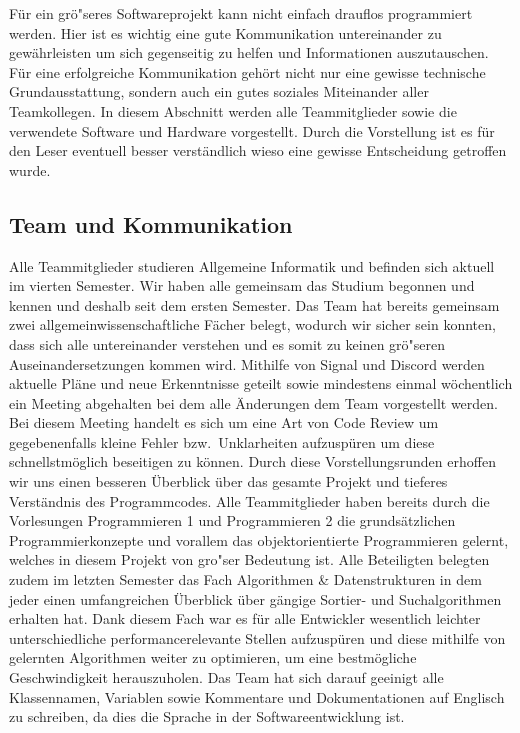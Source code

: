 F\"ur ein gr\"o"seres Softwareprojekt kann nicht einfach drauflos programmiert werden.
Hier ist es wichtig eine gute Kommunikation untereinander zu gew\"ahrleisten um sich gegenseitig zu helfen und Informationen auszutauschen.
F\"ur eine erfolgreiche Kommunikation geh\"ort nicht nur eine gewisse technische Grundausstattung, sondern auch ein gutes soziales Miteinander aller Teamkollegen.
In diesem Abschnitt werden alle Teammitglieder sowie die verwendete Software und Hardware vorgestellt.
Durch die Vorstellung ist es f\"ur den Leser eventuell besser verst\"andlich wieso eine gewisse Entscheidung getroffen wurde.

\subsection{Team und Kommunikation}\label{subsec:team-und-kommunikation}
Alle Teammitglieder studieren Allgemeine Informatik und befinden sich aktuell im vierten Semester.
Wir haben alle gemeinsam das Studium begonnen und kennen und deshalb seit dem ersten Semester.
Das Team hat bereits gemeinsam zwei allgemeinwissenschaftliche F\"acher belegt, wodurch wir sicher sein konnten, dass sich alle untereinander verstehen und es somit zu keinen gr\"o"seren Auseinandersetzungen kommen wird.
Mithilfe von Signal und Discord werden aktuelle Pl\"ane und neue Erkenntnisse geteilt sowie mindestens einmal w\"ochentlich ein Meeting abgehalten bei dem alle \"Anderungen dem Team vorgestellt werden.
Bei diesem Meeting handelt es sich um eine Art von Code Review um gegebenenfalls kleine Fehler bzw.\ Unklarheiten aufzusp\"uren um diese schnellstm\"oglich beseitigen zu k\"onnen.
Durch diese Vorstellungsrunden erhoffen wir uns einen besseren \"Uberblick \"uber das gesamte Projekt und tieferes Verst\"andnis des Programmcodes.
Alle Teammitglieder haben bereits durch die Vorlesungen Programmieren 1 und Programmieren 2 die grunds\"atzlichen Programmierkonzepte und vorallem das objektorientierte Programmieren gelernt, welches in diesem Projekt von gro"ser Bedeutung ist.
Alle Beteiligten belegten zudem im letzten Semester das Fach Algorithmen \& Datenstrukturen in dem jeder einen umfangreichen \"Uberblick \"uber g\"angige Sortier- und Suchalgorithmen erhalten hat.
Dank diesem Fach war es f\"ur alle Entwickler wesentlich leichter unterschiedliche performancerelevante Stellen aufzusp\"uren und diese mithilfe von gelernten Algorithmen weiter zu optimieren, um eine bestm\"ogliche Geschwindigkeit herauszuholen.
Das Team hat sich darauf geeinigt alle Klassennamen, Variablen sowie Kommentare und Dokumentationen auf Englisch zu schreiben, da dies die Sprache in der Softwareentwicklung ist.
